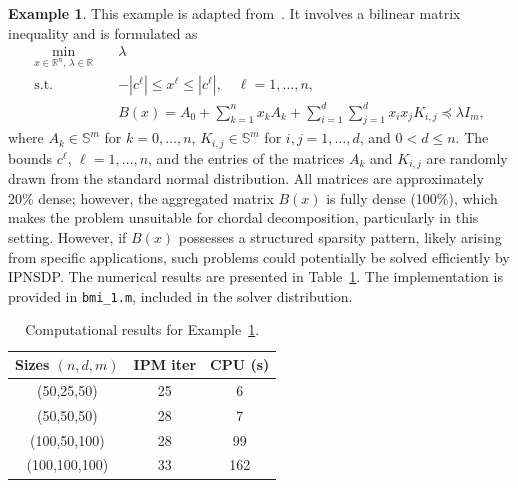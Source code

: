 \documentclass[]{interact}
\theoremstyle{plain}%
\theoremstyle{definition}
\newtheorem{example}[theorem]{Example}
\theoremstyle{remark}
\begin{document}
\begin{example}\label{eg:bmi}
This example is adapted from~\cite{M_stingleTheis_2006}. It involves a bilinear matrix inequality and is formulated as
\begin{equation}
\begin{aligned}
    \min_{x \in \mathbb{R}^n,\, \lambda \in \mathbb{R}} \quad & \lambda \\
    \text{s.t.} \quad 
    & -|c^\ell| \leq x^\ell \leq |c^\ell|, \quad \ell = 1, \dots, n, \\
    & B(x) = A_0 + \sum_{k=1}^n x_k A_k + \sum_{i=1}^d \sum_{j=1}^d x_i x_j K_{i,j} \preceq \lambda I_m,
\end{aligned}
\tag{11.1}
\end{equation}
where \(A_k \in \mathbb{S}^m\) for \(k = 0, \dots, n\), \(K_{i,j} \in \mathbb{S}^m\) for \(i,j = 1, \dots, d\), and \(0 < d \leq n\). The bounds \(c^\ell\), \(\ell = 1, \dots, n\), and the entries of the matrices \(A_k\) and \(K_{i,j}\) are randomly drawn from the standard normal distribution. All matrices are approximately 20\% dense; however, the aggregated matrix \(B(x)\) is fully dense (100\%), which makes the problem unsuitable for chordal decomposition, particularly in this setting. However, if \(B(x)\) possesses a structured sparsity pattern, likely arising from specific applications, such problems could potentially be solved efficiently by IPNSDP. The numerical results are presented in Table~\ref{tab:bmi}. The implementation is provided in \texttt{bmi\_1.m}, included in the solver distribution.
\begin{table}
\centering
\caption{Computational results for Example~\ref{eg:bmi}.}
\begin{tabular}{ccc}
\toprule
Sizes $(n,d,m)$ & IPM iter & CPU (s) \\
\midrule
(50,25,50)  & 25& 6 \\
(50,50,50)   & 28 & 7 \\
(100,50,100)   & 28 & 99\\
(100,100,100)   & 33 & 162 \\
\bottomrule
\end{tabular}\label{tab:bmi}
\end{table}


\end{example}
\end{document}
